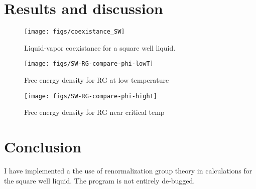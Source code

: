 \documentclass[letterpaper,twocolumn,amsmath,amssymb,prb]{revtex4-1}
\newcommand{\1}{\ensuremath{\textbf{r}_1}}
\newcommand{\2}{\ensuremath{\textbf{r}_2}}
\begin{document}
\section{Results and discussion}

\begin{figure}
  \begin{center}
  \texttt{[image: figs/coexistance\_SW]}
  \end{center}
  \caption{Liquid-vapor coexistance for a square well liquid.}
  \label{fig:coexistance_SW}
\end{figure}

\begin{figure}
  \begin{center}
  \texttt{[image: figs/SW-RG-compare-phi-lowT]}
  \end{center}
  \caption{Free energy density for RG at low temperature}
  \label{fig:SW-RG-compare-lowT}
\end{figure}

\begin{figure}
  \begin{center}
  \texttt{[image: figs/SW-RG-compare-phi-highT]}
  \end{center}
  \caption{Free energy density for RG near critical temp}
  \label{fig:SW-RG-compare-highT}
\end{figure}



\section{Conclusion}
I have implemented a the use of renormalization group theory in calculations for the square well liquid. The program is not entirely de-bugged.



\end{document}
